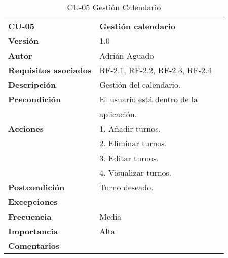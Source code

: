 \begin{table}
\begin{tabular}{llr}  
\toprule
\begin{minipage}[b]{0.24\columnwidth}\raggedright\strut
\textbf{CU-05}\strut
\end{minipage} & \begin{minipage}[b]{0.72\columnwidth}\raggedright\strut
\textbf{Gestión calendario}\strut
\end{minipage}\tabularnewline
\cmidrule(r){1-2}
\textbf{Versión}       & 1.0           \\
\textbf{Autor}       & Adrián  Aguado    \\
\textbf{Requisitos asociados}       & RF-2.1, RF-2.2, RF-2.3, RF-2.4  \\ 
\textbf{Descripción} & Gestión del calendario.\\
\textbf{Precondición} & El usuario está dentro de la \\
& aplicación.       \\
\textbf{Acciones} & 1. Añadir turnos. \\
& 2. Eliminar turnos. \\
& 3. Editar turnos. \\
& 4. Visualizar turnos. \\
\textbf{Postcondición} & Turno deseado. \\
\textbf{Excepciones} &     \\
\textbf{Frecuencia} & Media          \\
\textbf{Importancia} & Alta            \\
\textbf{Comentarios } &      \\
\bottomrule
\end{tabular}
\caption{CU-05 Gestión Calendario} 
\end{table}

